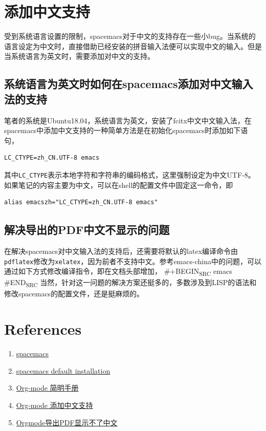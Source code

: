\documentclass[11pt]{article}
\begin{document}
\section{添加中文支持}
\label{sec:orga1caafc}
受到系统语言设置的限制，spacemacs对于中文的支持存在一些小bug。当系统的语言设定为中文时，直接借助已经安装的拼音输入法便可以实现中文的输入。但是当系统语言为英文时，需要添加对中文的支持。

\subsection{系统语言为英文时如何在spacemacs添加对中文输入法的支持}
\label{sec:org1e15d7d}
笔者的系统是Ubuntu18.04，系统语言为英文，安装了fcitx中文中文输入法，在spacemacs中添加中文支持的一种简单方法是在初始化spacemacs时添加如下语句，
\begin{verbatim}
LC_CTYPE=zh_CN.UTF-8 emacs
\end{verbatim}
其中\texttt{LC\_CTYPE}表示本地字符和字符串的编码格式，这里强制设定为中文UTF-8。如果笔记的内容主要为中文，可以在shell的配置文件中固定这一命令，即
\begin{verbatim}
alias emacszh="LC_CTYPE=zh_CN.UTF-8 emacs"
\end{verbatim}

\subsection{解决导出的PDF中文不显示的问题}
\label{sec:org9329138}
在解决spacemacs对中文输入法的支持后，还需要将默认的latex编译命令由\texttt{pdflatex}修改为\texttt{xelatex}，因为前者不支持中文。参考emacs-china中的问题，可以通过如下方式修改编译指令，即在文档头部增加，
\#+BEGIN\textsubscript{SRC} emacs
\#END\textsubscript{SRC}
当然，针对这一问题的解决方案还挺多的，多数涉及到LISP的语法和修改spacemacs的配置文件，还是挺麻烦的。

\section{References}
\label{sec:org0854672}
\begin{enumerate}
\item \href{http://spacemacs.org/\#}{spacemacs}
\item \href{https://github.com/syl20bnr/spacemacs\#default-installation}{spacemacs default installation}
\item \href{https://www.cnblogs.com/Open\_Source/archive/2011/07/17/2108747.html}{Org-mode 简明手册}
\item \href{https://emacs-china.org/t/topic/4465}{Org-mode 添加中文支持}
\item \href{https://emacs-china.org/t/topic/2540}{Orgmode导出PDF显示不了中文}
\end{enumerate}
\end{document}
